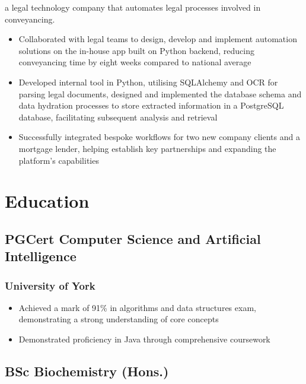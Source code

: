 \documentclass{article}
\begin{document}
\begin{paracol}{2}
  {\noindent\small a legal technology company that automates legal processes involved in conveyancing.}
  \begin{itemize}[leftmargin=*]
    \setlength\itemsep{-2pt}
    \item Collaborated with legal teams to design, develop and implement automation solutions on the in-house app built on Python backend, reducing conveyancing time by eight weeks compared to national average
    \item Developed internal tool in Python, utilising SQLAlchemy and OCR for parsing legal documents, designed and implemented the database schema and data hydration processes to store extracted information in a PostgreSQL database, facilitating subsequent analysis and retrieval
    \item Successfully integrated bespoke workflows for two new company clients and a mortgage lender, helping establish key partnerships and expanding the platform's capabilities
  \end{itemize}

  \section{Education}
  \subsection{PGCert Computer Science and Artificial Intelligence}
  \subsubsection{University of York}
  \hspace*{\fill}{\small Awarded 2023}
  \begin{itemize}[leftmargin=*]
    \setlength\itemsep{-2pt}
    \item Achieved a mark of 91\% in algorithms and data structures exam, demonstrating a strong understanding of core concepts
    \item Demonstrated proficiency in Java through comprehensive coursework
  \end{itemize}

  \subsection{BSc Biochemistry (Hons.)}

\end{paracol}
\end{document}
